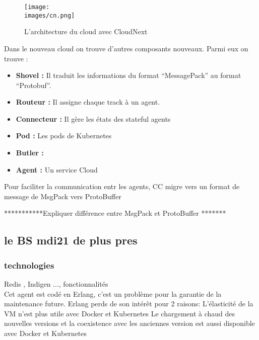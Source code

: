        \begin{figure}[h!]
            \centering
            \texttt{[image: \\images/cn.png]}
            \caption{L'architecture du cloud avec CloudNext}
            \label{fig:cn}
        \end{figure}

        \vspace{0.2cm}

        Dans le nouveau cloud on trouve d'autres composants nouveaux. 
        Parmi eux on trouve : \\[0.3cm]
        \begin{itemize}
            \renewcommand{\labelitemi}{$\bullet$}
                \item \textbf{Shovel :} Il traduit les informations du format “MessagePack” au format “Protobuf”.\\
                \item \textbf{Routeur :} Il assigne chaque track à un agent.\\
                \item \textbf{Connecteur :} Il gère les états des stateful agents\\ 
                \item \textbf{Pod :} Les pods de Kubernetes\\
                \item \textbf{Butler :} \\
                \item \textbf{Agent :} Un service Cloud \\
            \end{itemize} 

            Pour faciliter la communication entr les agents, \gls{CC} migre vers un format de message de MsgPack  vers ProtoBuffer 

            \vspace{0.2cm}

***********Expliquer différence entre MsgPack et ProtoBuffer *******

    \subsection{le BS \gls{mdi21} de plus pres}

        \subsubsection{technologies}
        Redis , Indigen ..., fonctionnalités \\
        Cet agent est codé en Erlang, c’est un problème pour la garantie de la maintenance future.
        Erlang perds de son intérêt pour 2 raisons:
            L'élasticité de la VM n’est plus utile avec Docker et Kubernetes
            Le chargement à chaud des nouvelles versions et la coexistence avec les anciennes version est aussi 
            disponible avec Docker et Kubernetes

